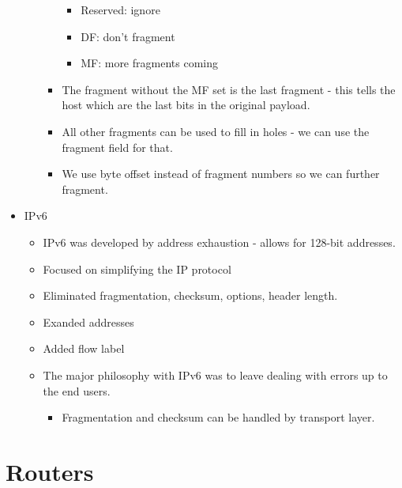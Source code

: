 \begin{itemize}
\begin{itemize}
\begin{itemize}
      \begin{itemize}
      \tightlist
      \item
        Reserved: ignore
      \item
        DF: don't fragment
      \item
        MF: more fragments coming
      \end{itemize}
    \item
      The fragment without the MF set is the last fragment - this tells
      the host which are the last bits in the original payload.
    \item
      All other fragments can be used to fill in holes - we can use the
      fragment field for that.
    \item
      We use byte offset instead of fragment numbers so we can further
      fragment.
    \end{itemize}
  \end{itemize}
\item
  IPv6

  \begin{itemize}
  \tightlist
  \item
    IPv6 was developed by address exhaustion - allows for 128-bit
    addresses.
  \item
    Focused on simplifying the IP protocol
  \item
    Eliminated fragmentation, checksum, options, header length.
  \item
    Exanded addresses
  \item
    Added flow label
  \item
    The major philosophy with IPv6 was to leave dealing with errors up
    to the end users.

    \begin{itemize}
    \tightlist
    \item
      Fragmentation and checksum can be handled by transport layer.
    \end{itemize}
  \end{itemize}
\end{itemize}

\hypertarget{routers}{%
\section{Routers}\label{routers}}

